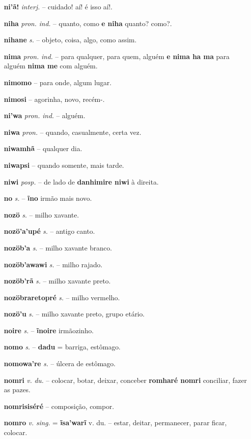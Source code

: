 \textbf{ni'ã!} \textit{interj.} -- cuidado! aí! é isso aí!.

\textbf{niha} \textit{pron. ind.} -- quanto, como  \textbf{e niha} quanto? como?.

\textbf{nihane} \textit{s.} -- objeto, coisa, algo, como assim.

\textbf{nima} \textit{pron. ind.} -- para qualquer, para quem, alguém  \textbf{e nima ha ma} para alguém  \textbf{nima me} com alguém.

\textbf{nimomo} -- para onde, algum lugar.

\textbf{nimosi} -- agorinha, novo, recém-.

\textbf{ni'wa} \textit{pron. ind.} -- alguém.

\textbf{niwa} \textit{pron.} -- quando, casualmente, certa vez.

\textbf{niwamhã} -- qualquer dia.

\textbf{niwapsi} -- quando somente, mais tarde.

\textbf{niwi} \textit{posp.} -- de lado de  \textbf{danhimire niwi} à direita.

\textbf{no} \textit{s.} -- \textbf{ĩno} irmão mais novo.

\textbf{nozö} \textit{s.} -- milho xavante.

\textbf{nozö'a'upé} \textit{s.} -- antigo canto.

\textbf{nozöb'a} \textit{s.} -- milho xavante branco.

\textbf{nozöb'awawi} \textit{s.} -- milho rajado.

\textbf{nozöb'rã} \textit{s.} -- milho xavante preto.

\textbf{nozöbraretopré} \textit{s.} -- milho vermelho.

\textbf{nozö'u} \textit{s.} -- milho xavante preto, grupo etário.

\textbf{noire} \textit{s.} -- \textbf{ĩnoire} irmãozinho.

\textbf{nomo} \textit{s.} -- \textbf{dadu} = barriga, estômago.

\textbf{nomowa're} \textit{s.} -- úlcera de estômago.

\textbf{nomri} \textit{v. du.} -- colocar, botar, deixar, conceber  \textbf{romharé nomri} conciliar, fazer as pazes.

\textbf{nomrisiséré} -- composição, compor.

\textbf{nomro} \textit{v. sing.} = \textbf{ĩsa'warĩ} v. du. -- estar, deitar, permanecer, parar ficar, colocar.

